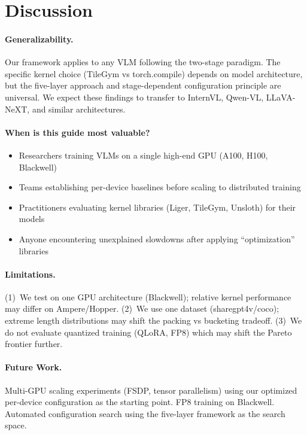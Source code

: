 \documentclass[11pt,a4paper]{article}
\begin{document}
\section{Discussion}
\label{sec:discussion}

\paragraph{Generalizability.}
Our framework applies to any VLM following the two-stage paradigm. The specific kernel
choice (TileGym vs torch.compile) depends on model architecture, but the five-layer
approach and stage-dependent configuration principle are universal. We expect these findings
to transfer to InternVL, Qwen-VL, LLaVA-NeXT, and similar architectures.

\paragraph{When is this guide most valuable?}
\begin{itemize}[leftmargin=*,nosep]
\item Researchers training VLMs on a single high-end GPU (A100, H100, Blackwell)
\item Teams establishing per-device baselines before scaling to distributed training
\item Practitioners evaluating kernel libraries (Liger, TileGym, Unsloth) for their models
\item Anyone encountering unexplained slowdowns after applying ``optimization'' libraries
\end{itemize}

\paragraph{Limitations.}
(1)~We test on one GPU architecture (Blackwell); relative kernel performance may differ on
Ampere/Hopper. (2)~We use one dataset (sharegpt4v/coco); extreme length distributions may
shift the packing vs bucketing tradeoff. (3)~We do not evaluate quantized training (QLoRA,
FP8) which may shift the Pareto frontier further.

\paragraph{Future Work.}
Multi-GPU scaling experiments (FSDP, tensor parallelism) using our optimized per-device
configuration as the starting point. FP8 training on Blackwell. Automated configuration
search using the five-layer framework as the search space.
\end{document}
